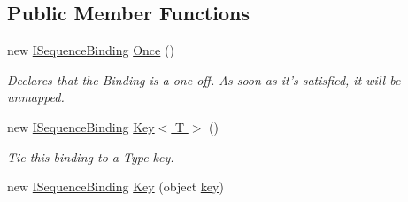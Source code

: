 \subsection*{Public Member Functions}
\begin{DoxyCompactItemize}
\item 
\hypertarget{interfacestrange_1_1extensions_1_1sequencer_1_1api_1_1_i_sequence_binding_a2ee9928660f3e2973c970aa8c802b648}{new \hyperlink{interfacestrange_1_1extensions_1_1sequencer_1_1api_1_1_i_sequence_binding}{I\-Sequence\-Binding} \hyperlink{interfacestrange_1_1extensions_1_1sequencer_1_1api_1_1_i_sequence_binding_a2ee9928660f3e2973c970aa8c802b648}{Once} ()}\label{interfacestrange_1_1extensions_1_1sequencer_1_1api_1_1_i_sequence_binding_a2ee9928660f3e2973c970aa8c802b648}

\begin{DoxyCompactList}\small\item\em Declares that the Binding is a one-\/off. As soon as it's satisfied, it will be unmapped. \end{DoxyCompactList}\item 
\hypertarget{interfacestrange_1_1extensions_1_1sequencer_1_1api_1_1_i_sequence_binding_ad9eacc67095bab83962224f4f6817360}{new \hyperlink{interfacestrange_1_1extensions_1_1sequencer_1_1api_1_1_i_sequence_binding}{I\-Sequence\-Binding} \hyperlink{interfacestrange_1_1extensions_1_1sequencer_1_1api_1_1_i_sequence_binding_ad9eacc67095bab83962224f4f6817360}{Key$<$ T $>$} ()}\label{interfacestrange_1_1extensions_1_1sequencer_1_1api_1_1_i_sequence_binding_ad9eacc67095bab83962224f4f6817360}

\begin{DoxyCompactList}\small\item\em Tie this binding to a Type key. \end{DoxyCompactList}\item 
\hypertarget{interfacestrange_1_1extensions_1_1sequencer_1_1api_1_1_i_sequence_binding_aa642a49f7ec617c55b26e6dadc13a1f4}{new \hyperlink{interfacestrange_1_1extensions_1_1sequencer_1_1api_1_1_i_sequence_binding}{I\-Sequence\-Binding} \hyperlink{interfacestrange_1_1extensions_1_1sequencer_1_1api_1_1_i_sequence_binding_aa642a49f7ec617c55b26e6dadc13a1f4}{Key} (object \hyperlink{interfacestrange_1_1framework_1_1api_1_1_i_binding_acec8686208598f9f4a952ffd05449c4d}{key})}\label{interfacestrange_1_1extensions_1_1sequencer_1_1api_1_1_i_sequence_binding_aa642a49f7ec617c55b26e6dadc13a1f4}


\end{DoxyCompactItemize}
